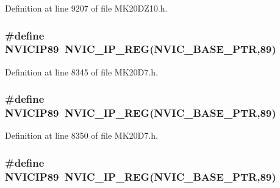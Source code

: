 Definition at line 9207 of file M\+K20\+D\+Z10.\+h.

\subsubsection[{\texorpdfstring{N\+V\+I\+C\+I\+P89}{NVICIP89}}]{\setlength{\rightskip}{0pt plus 5cm}\#define N\+V\+I\+C\+I\+P89~{\bf N\+V\+I\+C\+\_\+\+I\+P\+\_\+\+R\+EG}({\bf N\+V\+I\+C\+\_\+\+B\+A\+S\+E\+\_\+\+P\+TR},89)}\hypertarget{group___n_v_i_c___register___accessor___macros_gaafa329613db60521aca5d5516fd99213}{}\label{group___n_v_i_c___register___accessor___macros_gaafa329613db60521aca5d5516fd99213}


Definition at line 8345 of file M\+K20\+D7.\+h.

\subsubsection[{\texorpdfstring{N\+V\+I\+C\+I\+P89}{NVICIP89}}]{\setlength{\rightskip}{0pt plus 5cm}\#define N\+V\+I\+C\+I\+P89~{\bf N\+V\+I\+C\+\_\+\+I\+P\+\_\+\+R\+EG}({\bf N\+V\+I\+C\+\_\+\+B\+A\+S\+E\+\_\+\+P\+TR},89)}\hypertarget{group___n_v_i_c___register___accessor___macros_gaafa329613db60521aca5d5516fd99213}{}\label{group___n_v_i_c___register___accessor___macros_gaafa329613db60521aca5d5516fd99213}


Definition at line 8350 of file M\+K20\+D7.\+h.

\subsubsection[{\texorpdfstring{N\+V\+I\+C\+I\+P89}{NVICIP89}}]{\setlength{\rightskip}{0pt plus 5cm}\#define N\+V\+I\+C\+I\+P89~{\bf N\+V\+I\+C\+\_\+\+I\+P\+\_\+\+R\+EG}({\bf N\+V\+I\+C\+\_\+\+B\+A\+S\+E\+\_\+\+P\+TR},89)}\hypertarget{group___n_v_i_c___register___accessor___macros_gaafa329613db60521aca5d5516fd99213}{}\label{group___n_v_i_c___register___accessor___macros_gaafa329613db60521aca5d5516fd99213}


